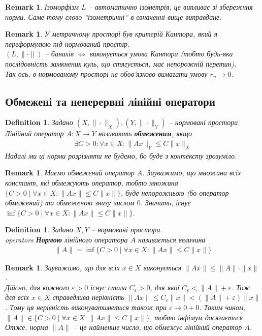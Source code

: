 \documentclass[a4paper, 10pt]{article}
\theoremstyle{theoremdd}
\theoremstyle{theoremdd}
\newtheorem{definition}[theorem]{Definition}
\theoremstyle{theoremdd}
\theoremstyle{theoremdd}
\theoremstyle{theoremdd}
\theoremstyle{theoremdd}
\newtheorem{remark}[theorem]{Remark}
\theoremstyle{theoremdd}
\theoremstyle{theoremdd}
\begin{document}
\begin{remark}
Ізоморфізм $L$ -- автоматично ізометрія, це випливає зі збережння норми. Саме тому слово ''ізометричні'' в означенні вище виправдане.
\end{remark}

\begin{remark}
У метричному просторі був критерій Кантора, який я переформулюю під нормований простір.\\
$(L,\|\cdot \|)$ -- банахів $\iff$ виконується умова Кантора (тобто будь-яка послідовність замкнених куль, що стягується, має непорожній перетин).\\
Так ось, в нормованому просторі не обов'язково вимагати умову $r_n \to 0$.
\end{remark}

\subsection{Обмежені та неперервні лінійні оператори}
\begin{definition}
Задано $(X, \|\cdot \|_X),(Y, \| \cdot \|_Y)$ -- нормовані простори.\\
Лінійний оператор $A \colon X \to Y$ називають \textbf{обмеженим}, якщо
\begin{align*}
\exists C > 0: \forall x \in X: \| Ax \|_Y \leq C \| x \|_X
\end{align*}
Надалі ми ці норми розрізняти не будемо, бо буде з контексту зрозуміло.
\end{definition}

\begin{remark}
Маємо обмежений оператор $A$. Зауважимо, що множина всіх констант, які обмежують оператор, тобто множина $\{C > 0 \mid \forall x \in X: \| Ax\| \leq C \|x\|\}$, буде непорожньою (бо оператор обмежений) та обмеженою знизу числом $0$. Значить, існує $\displaystyle\inf\{C > 0 \mid \forall x \in X: \| Ax\| \leq C \|x\|\}$.
\end{remark}

\begin{definition}
Задано $X,Y$ -- нормовані простори.\\operators
\textbf{Нормою} лінійного оператора $A$ називається величина
\begin{align*}
 \| A\| = \inf \{C > 0 \mid \forall x \in X: \| Ax \| \leq C \|x\|\}
\end{align*}
\end{definition}

\begin{remark}
Зауважимо, що для всіх $x \in X$ виконується $\|Ax\| \leq \|A\| \cdot \|x\|$.\\
Дійсно, для кожного $\varepsilon > 0$ існус стала $C_\varepsilon > 0$, для якої $C_\varepsilon < \|A\| + \varepsilon$. Тож для всіх $x \in X$ справедлива нерівність $\|A x\| \leq C_\varepsilon \|x\| < (\| A \| + \varepsilon) \|x\|$. Тому ця нерівність виконуватиметься також при $\varepsilon \to 0+0$. Таким чином, $\|A\| \in \{C > 0 \mid \forall x \in X: \|Ax\| \leq C \|x\|\}$, тобто інфімум досягається. \\
Отже, норма $\|A\|$ -- це найменше число, що обмежує лінійний оператор $A$.
\end{remark}
\end{document}
